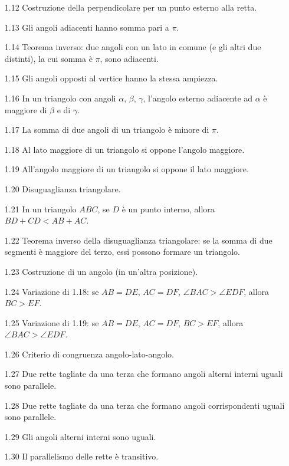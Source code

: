 \begin{enumerate}
    \item [1.12] Costruzione della perpendicolare per un punto esterno alla retta. %
    \item [1.13] Gli angoli adiacenti hanno somma pari a $\pi$. %
    \item [1.14] Teorema inverso: due angoli con un lato in comune (e gli altri due distinti), la cui somma è $\pi$, sono adiacenti. %
    \item [1.15] Gli angoli opposti al vertice hanno la stessa ampiezza. %
    \item [1.16] In un triangolo con angoli $\alpha$, $\beta$, $\gamma$, l'angolo esterno adiacente ad $\alpha$ è maggiore di $\beta$ e di $\gamma$. %
    \item [1.17] La somma di due angoli di un triangolo è minore di $\pi$. %
    \item [1.18] Al lato maggiore di un triangolo si oppone l'angolo maggiore. %
    \item [1.19] All'angolo maggiore di un triangolo si oppone il lato maggiore. %
    \item [1.20] Disuguaglianza triangolare. %
    \item [1.21] In un triangolo $ABC$, se $D$ è un punto interno, allora $BD + CD < AB + AC$. %
    \item [1.22] Teorema inverso della disuguaglianza triangolare: se la somma di due segmenti è maggiore del terzo, essi possono formare un triangolo. %
    \item [1.23] Costruzione di un angolo (in un'altra posizione). %
    \item [1.24] Variazione di 1.18: se $AB = DE$, $AC = DF$, $\angle BAC > \angle EDF$, allora $BC > EF$. %
    \item [1.25] Variazione di 1.19: se $AB = DE$, $AC = DF$, $BC > EF$, allora $\angle BAC > \angle EDF$. %
    \item [1.26] Criterio di congruenza angolo-lato-angolo. %
    \item [1.27] Due rette tagliate da una terza che formano angoli alterni interni uguali sono parallele. %
    \item [1.28] Due rette tagliate da una terza che formano angoli corrispondenti uguali sono parallele. %
    \item [1.29] Gli angoli alterni interni sono uguali. %
    \item [1.30] Il parallelismo delle rette è transitivo. %

\end{enumerate}

